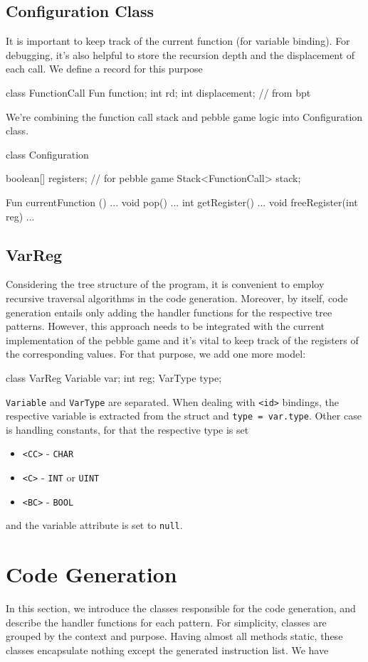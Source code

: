 \subsection{Configuration Class}
It is important to keep track of the current function (for variable binding). For debugging, it's also helpful to
store the recursion depth and the displacement of each call. We define a record for this purpose
\begin{codeblock}
class FunctionCall {
    Fun function;
    int rd;
    int displacement; // from bpt
}
\end{codeblock}
We're combining the function call stack and pebble game logic into Configuration class.
\begin{codeblock}
class Configuration {
    boolean[] registers; // for pebble game
    Stack<FunctionCall> stack;

    Fun currentFunction () { ... }
    void pop() { ... }
    int getRegister() { ... }
    void freeRegister(int reg) { ... }
}
\end{codeblock}
\newpage
\subsection{VarReg}
Considering the tree structure of the program, it is convenient to employ recursive traversal algorithms in the code generation.
Moreover, by itself, code generation entails only adding the handler functions for the respective tree patterns. However, this
approach needs to be integrated with the current implementation of the pebble game and it's vital
to keep track of the registers of the corresponding values. For that purpose, we add one more model:
\begin{codeblock}[VarReg]
class VarReg {
    Variable var;
    int reg;
    VarType type;
}
\end{codeblock}
\verb+Variable+ and \verb+VarType+ are separated. When dealing with \verb+<id>+ bindings, the respective variable is
extracted from the struct and \verb+type = var.type+. Other case is handling constants, for that the respective
type is set
\begin{itemize}
\item \verb+<CC>+ - \verb+CHAR+
\item \verb+<C>+ - \verb+INT+ or \verb+UINT+
\item \verb+<BC>+ - \verb+BOOL+
\end{itemize}
and the variable attribute is set to \verb+null+.
\newpage
\section{Code Generation}\label{sec:code_gen}
In this section, we introduce the classes responsible for the code generation, and describe the handler
functions for each pattern. For simplicity, classes are grouped by the context and purpose. Having almost all
methods static, these classes encapsulate nothing except the generated instruction list. We have
